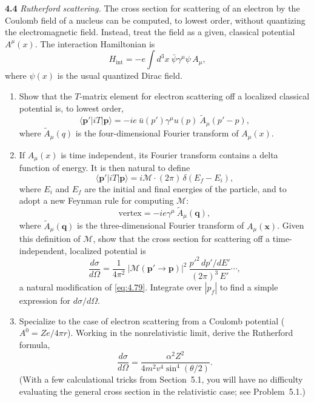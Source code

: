 \textbf{4.4} \emph{Rutherford scattering.}  The cross section for scattering
of an electron by the Coulomb field of a nucleus can be computed, to lowest
order, without quantizing the electromagnetic field.  Instead, treat the
field as a given, classical potential $A^\mu(x)$.  The interaction Hamiltonian
is
\begin{equation}
  H_{\mathrm{int}} = -e\int d^3x\ \bar{\psi}\gamma^\mu\psi\,A_\mu ,
\end{equation}
where $\psi(x)$ is the usual quantized Dirac field.
\begin{enumerate}[label=(\alph*)]
  \item Show that the $T$-matrix element for electron scattering off a
    localized classical potential is, to lowest order,
    \begin{equation}
      \langle \mathbf{p}'|iT|\mathbf{p}\rangle
        = -ie\ \bar{u}(p')\gamma^\mu u(p)\ \tilde{A}_\mu(p'-p) ,
    \end{equation}
    where $\tilde{A}_\mu(q)$ is the four-dimensional Fourier transform of
    $A_\mu(x)$.
  \item If $A_\mu(x)$ is time independent, its Fourier transform contains a
    delta function of energy.  It is then natural to define
    \begin{equation}
      \langle \mathbf{p}'|iT|\mathbf{p}\rangle
        = i\mathcal{M}\cdot(2\pi)\,\delta(E_f - E_i) ,
    \end{equation}
    where $E_i$ and $E_f$ are the initial and final energies of the
    particle, and to adopt a new Feynman rule for computing $\mathcal{M}$:
    \begin{equation}
      \text{vertex} = -ie\gamma^\mu\ \tilde{A}_\mu(\mathbf{q}),
    \end{equation}
    where $\tilde{A}_\mu(\mathbf{q})$ is the three-dimensional Fourier
    transform of $A_\mu(\mathbf{x})$.  Given this definition of $\mathcal{M}$,
    show that the cross section for scattering off a time-independent,
    localized potential is
    \begin{equation}
      \frac{d\sigma}{d\Omega} = \frac{1}{4\pi^2}\ |\mathcal{M}
        (\mathbf{p}'\to\mathbf{p})|^2\ \frac{p'^2\,dp'/dE'}{(2\pi)^3\,E'}
        \cdots ,
    \end{equation}
    a natural modification of \eqref{eq:4.79}.  Integrate over $|p_f|$ to
    find a simple expression for $d\sigma/d\Omega$.
  \item Specialize to the case of electron scattering from a Coulomb
    potential ($A^0 = Ze/4\pi r$).  Working in the nonrelativistic limit,
    derive the Rutherford formula,
    \begin{equation}
      \frac{d\sigma}{d\Omega} = \frac{\alpha^2Z^2}
        {4m^2v^4\sin^4(\theta/2)} .
    \end{equation}
    (With a few calculational tricks from Section~5.1, you will have no
    difficulty evaluating the general cross section in the relativistic case;
    see Problem~5.1.)
\end{enumerate}
